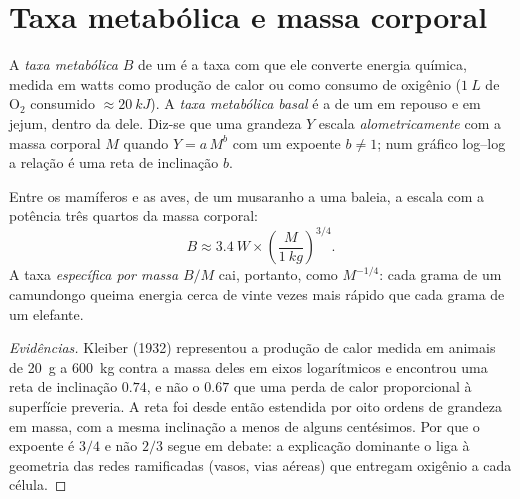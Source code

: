 \section{Taxa metabólica e massa corporal}

\begin{definition}\label{def:b1:organism-environment:allometry}
A \emph{taxa metabólica} $B$ de um  é a
taxa com que ele converte energia química, medida em watts como produção
de calor ou como consumo de oxigênio ($\qty{1}{L}$ de $\mathrm{O_2}$
consumido $\approx \qty{20}{kJ}$). A
\emph{taxa metabólica basal} é a de um
 em repouso e em jejum, dentro da 
dele. Diz-se que uma grandeza $Y$ escala
\emph{alometricamente} com a massa corporal $M$ quando
$Y = a\,M^{b}$ com um expoente $b \neq 1$; num gráfico log--log a
relação é uma reta de inclinação $b$.
\end{definition}

\begin{theorem}\label{thm:b1:organism-environment:kleiber}
Entre os mamíferos e as aves, de um musaranho a uma baleia, a  escala com a potência três quartos da massa corporal:
\[
B \approx \qty{3.4}{W}\times\left(\frac{M}{\qty{1}{kg}}\right)^{3/4}.
\]
A taxa \emph{específica por massa} $B/M$ cai, portanto, como $M^{-1/4}$:
cada grama de um camundongo queima energia cerca de vinte vezes mais
rápido que cada grama de um elefante.
\end{theorem}
\begin{proof}[Evidências]
Kleiber (1932) representou a produção de calor medida em animais de
\qty{20}{g} a \qty{600}{kg} contra a massa deles em eixos logarítmicos e
encontrou uma reta de inclinação $0.74$, e não o $0.67$ que uma perda de
calor proporcional à superfície preveria. A reta foi desde então
estendida por oito ordens de grandeza em massa, com a mesma inclinação a
menos de alguns centésimos. Por que o expoente é $3/4$ e não $2/3$ segue
em debate: a explicação dominante o liga à geometria das redes
ramificadas (vasos, vias aéreas) que entregam oxigênio a cada célula.
\end{proof}

